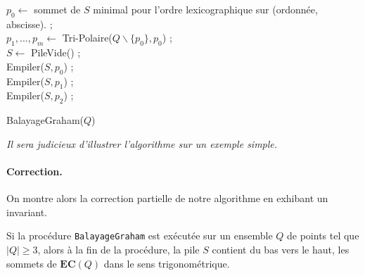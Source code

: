 \begin{algorithm}[!h]
$p_0 \leftarrow$ sommet de $S$ minimal pour l'ordre lexicographique sur (ordonnée, abscisse). ;\\
$p_1,...,p_m \leftarrow$ Tri-Polaire($Q\backslash \{p_0\},p_0$) ; \\

$S\leftarrow$ PileVide() ;\\

Empiler($S,p_0$) ;\\
Empiler($S,p_1$) ;\\
Empiler($S,p_2$) ;\\
\caption{BalayageGraham($Q$)}
\end{algorithm}


\begin{center}
\textit{Il sera judicieux d'illustrer l'algorithme sur un exemple simple.}
\end{center}

\paragraph{Correction.} On montre alors la correction partielle de notre algorithme en exhibant un invariant.

\begin{theorem}
Si la procédure {\tt BalayageGraham} est exécutée sur un ensemble $Q$ de points tel que $|Q| \geq 3$, alors à la fin de la procédure, la pile $S$ contient du bas vers le haut, les sommets de $\mathbf{EC}(Q)$ dans le sens trigonométrique.
\end{theorem}

